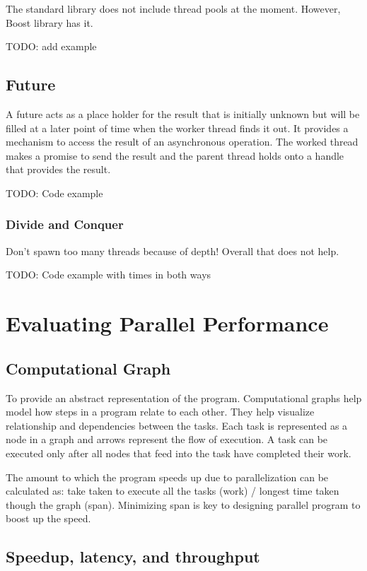 \documentclass{scrartcl}
\begin{document}
The standard library does not include thread pools at the moment. However, Boost library has it. 

TODO: add example

\subsection{Future}
A future acts as a place holder for the result that is initially unknown but will be filled at a later point of time when the worker thread finds it out. It provides a mechanism to access the result of an asynchronous operation. The worked thread makes a promise to send the result and the parent thread holds onto a handle that provides the result.

TODO: Code example

\subsubsection{Divide and Conquer}
Don't spawn too many threads because of depth! Overall that does not help.

TODO: Code example with times in both ways

\section{Evaluating Parallel Performance}

\subsection{Computational Graph}
To provide an abstract representation of the program. Computational graphs help model how steps in a program relate to each other. They help visualize relationship and dependencies between the tasks. Each task is represented as a node in a graph and arrows represent the flow of execution. A task can be executed only after all nodes that feed into the task have completed their work.

The amount to which the program speeds up due to parallelization can be calculated as: take taken to execute all the tasks (work) / longest time taken though the graph (span). Minimizing span is key to designing parallel program to boost up the speed.

\subsection{Speedup, latency, and throughput}
\end{document}

